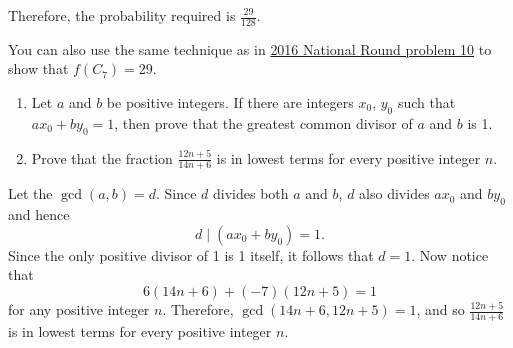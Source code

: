 \begin{solution}
    Therefore, the probability required is $\frac{29}{128}$.
\end{solution}
\begin{remark}
    You can also use the same technique as in \hyperref[sol: 2016 National
    Round P10]{2016 National Round problem 10} to show that $f(C_7) = 29$.
\end{remark}
\begin{question}
    \begin{enumerate}
        \item Let $a$ and $b$ be positive integers. If there are integers
            $x_{0}$, $y_{0}$ such that $ax_{0} + by_{0} = 1$, then prove that
            the greatest common divisor of $a$ and $b$ is 1. 
        
        \item Prove that the fraction $\frac{12n + 5}{14n + 6}$ is in lowest
            terms for every positive integer $n$.
    \end{enumerate}
\end{question}
\begin{solution}
    Let the $\gcd(a, b) = d$. Since $d$ divides both $a$ and $b$, $d$ also
    divides $ax_0$ and $by_0$ and hence
    \[ d \mid (ax_0 + by_0) = 1. \]
    Since the only positive divisor of 1 is 1 itself, it follows that $d = 1$.
    Now notice that
    \[ 6(14n + 6) + (-7)(12n + 5) = 1 \]
    for any positive integer $n$. Therefore, $\gcd(14n + 6, 12n + 5) = 1$, and
    so $\frac{12n + 5}{14n + 6}$ is in lowest terms for every positive integer
    $n$.
\end{solution}

